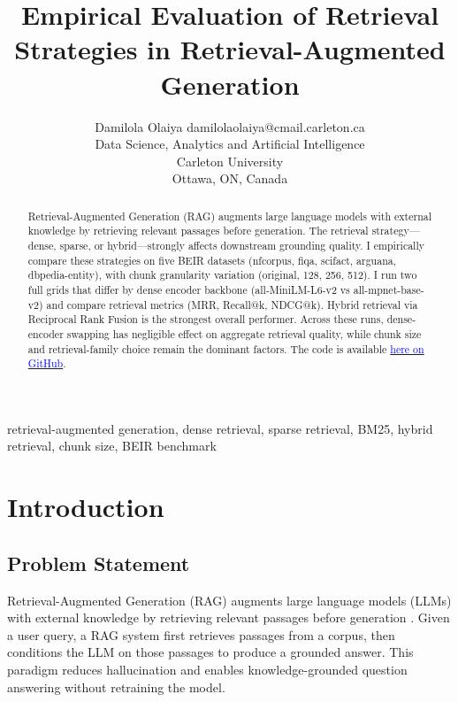 \documentclass[twoside, 11pt]{article}
\begin{document}
\title{Empirical Evaluation of Retrieval Strategies in Retrieval-Augmented Generation}

\author{\name Damilola Olaiya \email damilolaolaiya@cmail.carleton.ca \\
\addr Data Science, Analytics and Artificial Intelligence\\
Carleton University\\
Ottawa, ON, Canada}

\maketitle

\begin{abstract}
Retrieval-Augmented Generation (RAG) augments large language models with external knowledge by retrieving relevant passages before generation. The retrieval strategy---dense, sparse, or hybrid---strongly affects downstream grounding quality. I empirically compare these strategies on five BEIR datasets (nfcorpus, fiqa, scifact, arguana, dbpedia-entity), with chunk granularity variation (original, 128, 256, 512). I run two full grids that differ by dense encoder backbone (all-MiniLM-L6-v2 vs all-mpnet-base-v2) and compare retrieval metrics (MRR, Recall@k, NDCG@k). Hybrid retrieval via Reciprocal Rank Fusion is the strongest overall performer. Across these runs, dense-encoder swapping has negligible effect on aggregate retrieval quality, while chunk size and retrieval-family choice remain the dominant factors. The code is available \href{https://github.com/Daolaiya/rag-retrieval}{\textcolor{blue}{here on GitHub}}.
\end{abstract}

\begin{keywords}
retrieval-augmented generation, dense retrieval, sparse retrieval, BM25, hybrid retrieval, chunk size, BEIR benchmark
\end{keywords}

\section{Introduction}
\subsection{Problem Statement}
Retrieval-Augmented Generation (RAG) augments large language models (LLMs) with external knowledge by retrieving relevant passages before generation \citep{lewis2020rag}. Given a user query, a RAG system first retrieves passages from a corpus, then conditions the LLM on those passages to produce a grounded answer. This paradigm reduces hallucination and enables knowledge-grounded question answering without retraining the model.
\end{document}
